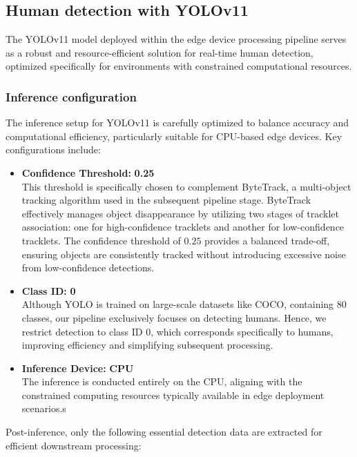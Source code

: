 \subsection{Human detection with YOLOv11}
\label{sec:edge_human_detection}

The YOLOv11 model deployed within the edge device processing pipeline serves as a robust and resource-efficient solution for real-time human detection, optimized specifically for environments with constrained computational resources.

\subsubsection{Inference configuration}

The inference setup for YOLOv11 is carefully optimized to balance accuracy and computational efficiency, particularly suitable for CPU-based edge devices. Key configurations include:

\begin{itemize}
    \item \textbf{Confidence Threshold:} \textbf{0.25}\\
    This threshold is specifically chosen to complement ByteTrack, a multi-object tracking algorithm used in the subsequent pipeline stage. ByteTrack effectively manages object disappearance by utilizing two stages of tracklet association: one for high-confidence tracklets and another for low-confidence tracklets. The confidence threshold of $0.25$ provides a balanced trade-off, ensuring objects are consistently tracked without introducing excessive noise from low-confidence detections.


    \item \textbf{Class ID:} \textbf{0}\\
    Although YOLO is trained on large-scale datasets like COCO, containing 80 classes, our pipeline exclusively focuses on detecting humans. Hence, we restrict detection to class ID $0$, which corresponds specifically to humans, improving efficiency and simplifying subsequent processing.

    \item \textbf{Inference Device:} \textbf{CPU}\\
    The inference is conducted entirely on the CPU, aligning with the constrained computing resources typically available in edge deployment scenarios.s
\end{itemize}

Post-inference, only the following essential detection data are extracted for efficient downstream processing:

